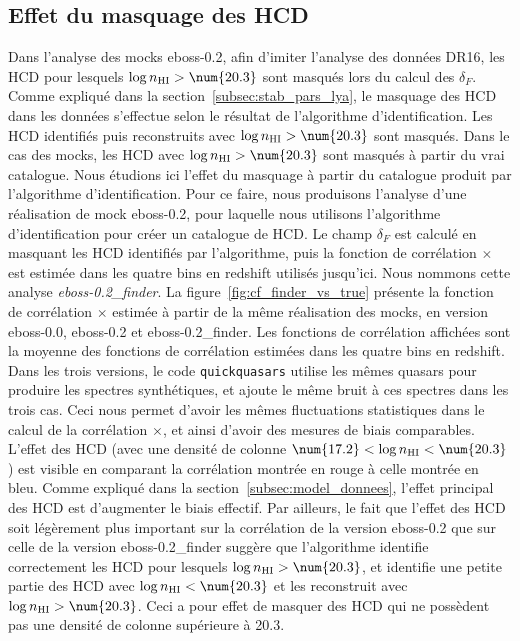 \subsection{Effet du masquage des HCD}
\label{subsec:effet_masquage_hcd}
Dans l'analyse des mocks eboss-0.2, afin d'imiter l'analyse des données DR16, les HCD pour lesquels $\log n_{\textsc{HI}} > \num{20.3}$ sont masqués lors du calcul des $\delta_F$.
Comme expliqué dans la section~\ref{subsec:stab_pars_lya}, le masquage des HCD dans les données s'effectue selon le résultat de l'algorithme d'identification. Les HCD identifiés puis reconstruits avec $\log n_{\textsc{HI}} > \num{20.3}$ sont masqués. Dans le cas des mocks, les HCD avec $\log n_{\textsc{HI}} > \num{20.3}$ sont masqués à partir du \og vrai \fg catalogue. Nous étudions ici l'effet du masquage à partir du catalogue produit par l'algorithme d'identification.
Pour ce faire, nous produisons l'analyse d'une réalisation de mock eboss-0.2, pour laquelle nous utilisons l'algorithme d'identification pour créer un catalogue de HCD. Le champ $\delta_F$ est calculé en masquant les HCD identifiés par l'algorithme, puis la fonction de corrélation \lya{}$\times$\lya{} est estimée dans les quatre bins en redshift utilisés jusqu'ici. Nous nommons cette analyse \emph{eboss-0.2\_finder}.
La figure~\ref{fig:cf_finder_vs_true} présente la fonction de corrélation \lya{}$\times$\lya{} estimée à partir de la même réalisation des mocks, en version eboss-0.0, eboss-0.2 et eboss-0.2\_finder.
Les fonctions de corrélation affichées sont la moyenne des fonctions de corrélation estimées dans les quatre bins en redshift.
Dans les trois versions, le code \texttt{quickquasars} utilise les mêmes quasars pour produire les spectres synthétiques, et ajoute le même bruit à ces spectres dans les trois cas. Ceci nous permet d'avoir les mêmes fluctuations statistiques dans le calcul de la corrélation \lya{}$\times$\lya{}, et ainsi d'avoir des mesures de biais comparables.
L'effet des HCD (avec une densité de colonne $\num{17.2} < \log n_{\textsc{HI}} < \num{20.3}$) est visible en comparant la corrélation montrée en rouge à celle montrée en bleu. Comme expliqué dans la section~\ref{subsec:model_donnees}, l'effet principal des HCD est d'augmenter le biais effectif.
Par ailleurs, le fait que l'effet des HCD soit légèrement plus important sur la corrélation de la version eboss-0.2 que sur celle de la version  eboss-0.2\_finder suggère que l'algorithme identifie correctement les HCD pour lesquels $\log n_{\textsc{HI}} > \num{20.3}$, et identifie une petite partie des HCD avec $\log n_{\textsc{HI}} < \num{20.3}$ et les reconstruit avec $\log n_{\textsc{HI}} > \num{20.3}$. Ceci a pour effet de masquer des HCD qui ne possèdent pas une densité de colonne supérieure à \num{20.3}.
